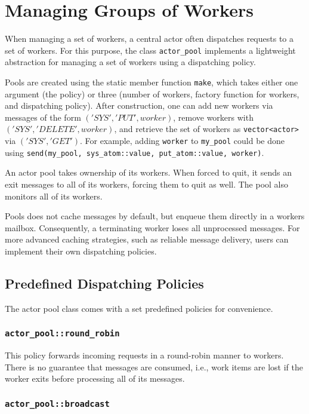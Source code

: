 \section{Managing Groups of Workers}
\label{Sec::WorkerGroups}

When managing a set of workers, a central actor often dispatches requests to a set of workers.
For this purpose, the class \lstinline^actor_pool^ implements a lightweight abstraction for managing a set of workers using a dispatching policy.

Pools are created using the static member function \lstinline^make^, which takes either one argument (the policy) or three (number of workers, factory function for workers, and dispatching policy).
After construction, one can add new workers via messages of the form $('SYS', 'PUT', worker)$, remove workers with $('SYS', 'DELETE', worker)$, and retrieve the set of workers as \lstinline^vector<actor>^ via $('SYS', 'GET')$.
For example, adding \lstinline^worker^ to \lstinline^my_pool^ could be done using \lstinline^send(my_pool, sys_atom::value, put_atom::value, worker)^.

An actor pool takes ownership of its workers.
When forced to quit, it sends an exit messages to all of its workers, forcing them to quit as well.
The pool also monitors all of its workers.

Pools does not cache messages by default, but enqueue them directly in a workers mailbox. Consequently, a terminating worker loses all unprocessed messages.
For more advanced caching strategies, such as reliable message delivery, users can implement their own dispatching policies. 

\subsection{Predefined Dispatching Policies}

The actor pool class comes with a set predefined policies for convenience.

\subsubsection{\lstinline^actor_pool::round_robin^}

This policy forwards incoming requests in a round-robin manner to workers.
There is no guarantee that messages are consumed, i.e., work items are lost if the worker exits before processing all of its messages.

\subsubsection{\lstinline^actor_pool::broadcast^}

